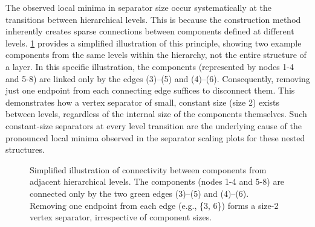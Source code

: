 The observed local minima in separator size occur systematically at the transitions between hierarchical levels.
This is because the construction method inherently creates sparse connections between components defined at different levels.
\cref{fig:nested_grid_connectivity_example} provides a simplified illustration of this principle, showing two example components from the same levels within the hierarchy, not the entire structure of a layer.
In this specific illustration, the components (represented by nodes 1-4 and 5-8) are linked only by the edges (3)--(5) and (4)--(6).
Consequently, removing just one endpoint from each connecting edge suffices to disconnect them.
This demonstrates how a vertex separator of small, constant size (size 2) exists between levels, regardless of the internal size of the components themselves.
Such constant-size separators at every level transition are the underlying cause of the pronounced local minima observed in the separator scaling plots for these nested structures.

\begin{figure}[tbhp]
    \centering
    \caption{Simplified illustration of connectivity between components from adjacent hierarchical levels. The components (nodes 1-4 and 5-8) are connected only by the two green edges (3)--(5) and (4)--(6). Removing one endpoint from each edge (e.g., \{3, 6\}) forms a size-2 vertex separator, irrespective of component sizes.}
    \label{fig:nested_grid_connectivity_example}
\end{figure}
